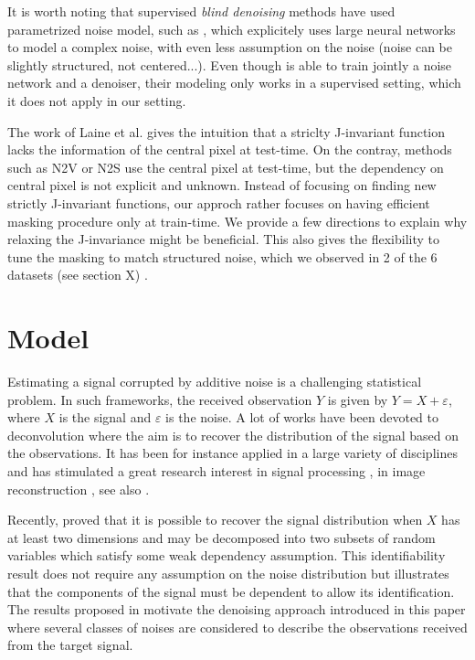 \documentclass{article}
\begin{document}
It is worth noting that supervised \textit{blind denoising} methods have used parametrized noise model, such as \cite{zhang2017beyond,yue2019variational}, which explicitely uses large neural networks to model a complex noise, with even less assumption on the noise (noise can be slightly structured, not centered...). Even though \cite{yue2019variational} is able to train jointly a noise network and a denoiser, their modeling only works in a supervised setting, which it does not apply in our setting.

The work of Laine et al. \cite{laine2019high} gives the intuition that a striclty J-invariant function lacks the information of the central pixel at test-time.
On the contray, methods such as N2V or N2S use the central pixel at test-time, but the dependency on central pixel is not explicit and unknown.
Instead of focusing on finding new strictly J-invariant functions, our approch rather focuses on having efficient masking procedure only at train-time.
We provide a few directions to explain why relaxing the J-invariance might be beneficial.
This also gives the flexibility to tune the masking to match structured noise, which we observed in 2 of the 6 datasets (see section X) \cite{broaddus2020removing}.

\section{Model}
\label{sec:model}

Estimating a signal corrupted by additive noise  is a challenging statistical problem. In such frameworks, the received observation $Y$ is given by $Y = X + \varepsilon$,  where $X$ is the signal and $\varepsilon$ is the noise. A lot of works have been devoted to deconvolution where the aim is to recover the distribution of the signal based on the observations. It has been for instance applied in a large variety of disciplines and has stimulated a great research interest in signal processing \cite{moulines1997maximum,attias1998blind}, in image reconstruction \cite{kundur1996blind,campisi2017blind}, see also  \cite{meister:2009}.


Recently, \cite{gassiat:lecorff:lehericy:2021} proved that it is possible to recover the signal distribution when $X$ has at least two dimensions and may be decomposed into two subsets of random variables which satisfy some weak dependency assumption. This identifiability result does not require any assumption on the noise distribution but illustrates that the components of the signal must be dependent to allow its identification. The results proposed in \cite{gassiat:lecorff:lehericy:2021} motivate the denoising approach introduced in this paper where several classes of noises are considered to describe the observations received from the target signal.  %
\end{document}
